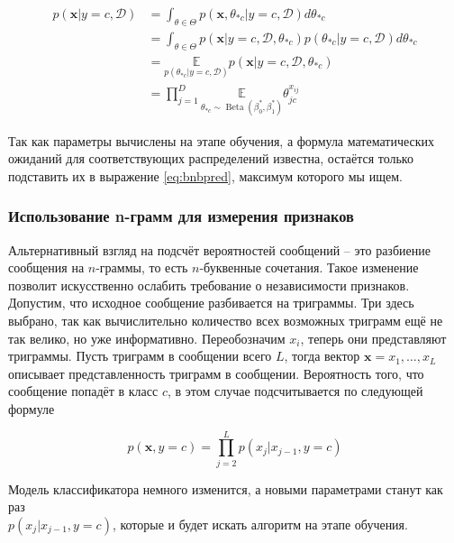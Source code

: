 \begin{align}
  p(\mathbf{x}|y=c,\mathcal{D}) &=\int_{\theta\in\Theta}p(\mathbf{x},\theta_{*c}|y=c,\mathcal{D})d\theta_{*c}\label{eq:maththeta1}\\
  &=\int_{\theta\in\Theta}p(\mathbf{x}|y=c,\mathcal{D},\theta_{*c})p(\theta_{*c}|y=c,\mathcal{D})d\theta_{*c}\label{eq:maththeta2}\\
  &=\underset{p(\theta_{*c}|y=c,\mathcal{D})} {\mathbb{E}}p(\mathbf{x}|y=c,\mathcal{D},\theta_{*c})\label{eq:maththeta2}\\
  &=\prod_{j=1}^D\underset{\theta_{*c}\sim\operatorname{Beta}(\beta_0^*,\beta_1^*)}{\mathbb{E}}\theta_{jc}^{x_{ij}}
\end{align}

Так как параметры вычислены на этапе обучения, а формула математических ожиданий для
соответствующих распределений известна, остаётся только подставить их в выражение \ref{eq:bnbpred},
максимум которого мы ищем.

\subsubsection{Использование n-грамм для измерения признаков}\label{ngram}
Альтернативный взгляд на подсчёт вероятностей сообщений -- это разбиение сообщения на $n$-граммы, то
есть $n$-буквенные сочетания. Такое изменение позволит искусственно ослабить требование о
независимости признаков. Допустим, что исходное сообщение разбивается на триграммы. Три здесь выбрано,
так как вычислительно количество всех возможных триграмм ещё не так велико, но уже информативно.
Переобозначим $x_i$, теперь они представляют триграммы. Пусть триграмм в сообщении всего $L$, тогда
вектор $\mathbf{x} = {x_1, \ldots, x_L}$ описывает представленность триграмм в сообщении.
Вероятность того, что сообщение попадёт в класс $c$, в этом случае подсчитывается по следующей формуле

\begin{equation}
  p(\mathbf{x}, y=c) = \prod_{j=2}^Lp(x_j|x_{j-1},y=c)
\end{equation}

Модель классификатора немного изменится, а новыми параметрами станут как раз\\
$p(x_j|x_{j-1},y=c)$, которые и будет искать алгоритм на этапе обучения.

